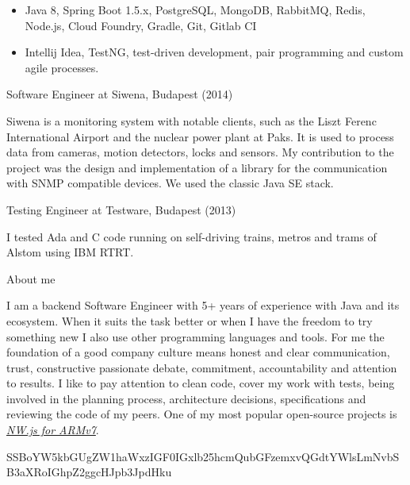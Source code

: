\documentclass[hidelinks,11pt]{friggeri-cv}
\newenvironment{experience}{\begin{adjustwidth}{-4.6cm}{}}{\end{adjustwidth}}
\begin{document}
\begin{experience}
\begin{itemize}
  \item Java 8, Spring Boot 1.5.x, PostgreSQL, MongoDB, RabbitMQ, Redis, Node.js, Cloud Foundry, Gradle, Git, Gitlab CI
  \item Intellij Idea, TestNG, test-driven development, pair programming and custom agile processes.
\end{itemize}

{\LARGE Software Engineer at Siwena, Budapest (2014)}

Siwena is a monitoring system with notable clients, such as the Liszt Ferenc International Airport and the nuclear power plant at Paks.
It is used to process data from cameras, motion detectors, locks and sensors.
My contribution to the project was the design and implementation of a library for the communication with SNMP compatible devices.
We used the classic Java SE stack.

{\LARGE Testing Engineer at Testware, Budapest (2013)}

I tested Ada and C code running on self-driving trains, metros and trams of Alstom using IBM RTRT.\@

{\LARGE About me}

I am a backend Software Engineer with 5+ years of experience with Java and its ecosystem.
When it suits the task better or when I have the freedom to try something new I also use other programming languages and tools.
For me the foundation of a good company culture means honest and clear communication, trust, constructive passionate debate, commitment, accountability and attention to results.
I like to pay attention to clean code, cover my work with tests, being involved in the planning process, architecture decisions, specifications and reviewing the code of my peers.
One of my most popular open-source projects is \href{https://github.com/LeonardLaszlo/nw.js-armv7-binaries}{\textit{NW.js for ARMv7}}.

SSBoYW5kbGUgZW1haWxzIGF0IGxlb25hcmQubGFzemxvQGdtYWlsLmNvbSB3aXRoIGhpZ2ggcHJpb3JpdHku

\end{experience}
\end{document}
